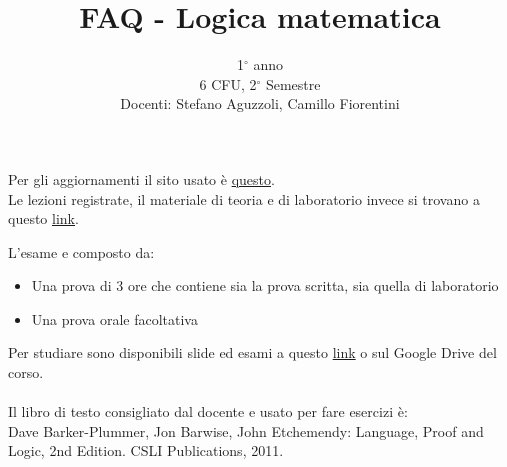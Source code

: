 \documentclass{article}
\title{FAQ - \textbf{Logica matematica}}
\author{
	1$^{\circ}$ anno \\6 CFU, 2$^{\circ}$ Semestre\\
	Docenti: Stefano Aguzzoli, Camillo Fiorentini \\ 
	\date{}
}
\begin{document}
 
\maketitle

\begin{QuestionList}

 {
    Per gli aggiornamenti il sito usato è \href{https://saguzzolilom.ariel.ctu.unimi.it/}{questo}.\\
    Le lezioni registrate, il materiale di teoria e di laboratorio invece si trovano a questo \href{https://homes.di.unimi.it/aguzzoli/logicatriennale.html}{link}.
}
	
 {
	L'esame e composto da: 
	
	\begin{itemize}
		\item Una prova di 3 ore che contiene sia la prova scritta, sia quella di laboratorio
		\item Una prova orale facoltativa
	\end{itemize}
}

 {
	Per studiare sono disponibili slide ed esami a questo 
	\href{https://homes.di.unimi.it/aguzzoli/logicatriennale.html}{link} 
	o sul Google Drive del corso. \\\\
	Il libro di testo consigliato dal docente e usato per fare esercizi è: \\
	Dave Barker-Plummer, Jon Barwise, John Etchemendy: Language, Proof and Logic, 2nd Edition. CSLI Publications, 2011.
}

\end{QuestionList}
\end{document}
